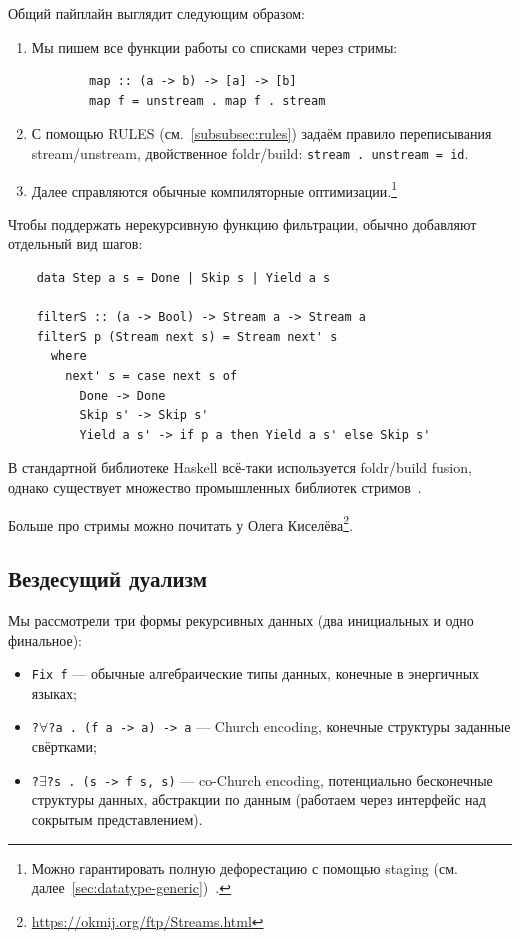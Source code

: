 Общий пайплайн выглядит следующим образом:
\begin{enumerate}
    \item Мы пишем все функции работы со списками через стримы:
    \begin{verbatim}
        map :: (a -> b) -> [a] -> [b]
        map f = unstream . map f . stream
    \end{verbatim}
    \item С помощью RULES (см.~\ref{subsubsec:rules}) задаём правило переписывания stream/unstream, двойственное foldr/build: \texttt{stream . unstream = id}.
    \item Далее справляются обычные компиляторные оптимизации.\footnote{Можно гарантировать полную дефорестацию с помощью staging (см. далее~\ref{sec:datatype-generic})~\cite{kiselyov2017stream}.}
\end{enumerate}

Чтобы поддержать нерекурсивную функцию фильтрации, обычно добавляют отдельный вид шагов:
\begin{verbatim}
    data Step a s = Done | Skip s | Yield a s

    filterS :: (a -> Bool) -> Stream a -> Stream a
    filterS p (Stream next s) = Stream next' s
      where
        next' s = case next s of
          Done -> Done
          Skip s' -> Skip s'
          Yield a s' -> if p a then Yield a s' else Skip s'
\end{verbatim}

В стандартной библиотеке Haskell всё-таки используется foldr/build fusion, однако существует множество промышленных библиотек стримов~\cite[глава 14]{bragilevsky-haskell}.

Больше про стримы можно почитать у Олега Киселёва\footnote{\url{https://okmij.org/ftp/Streams.html}}.

\subsection{Вездесущий дуализм} \label{subsec:data-duality}

Мы рассмотрели три формы рекурсивных данных (два инициальных и одно финальное):
\begin{itemize}
    \item \texttt{Fix f} --- обычные алгебраические типы данных, конечные в энергичных языках;
    \item \texttt{?$\forall$?a . (f a -> a) -> a} --- Church encoding, конечные структуры заданные свёртками;
    \item \texttt{?$\exists$?s . (s -> f s, s)} --- co-Church encoding, потенциально бесконечные структуры данных, абстракции по данным (работаем через интерфейс над сокрытым представлением).
\end{itemize}

